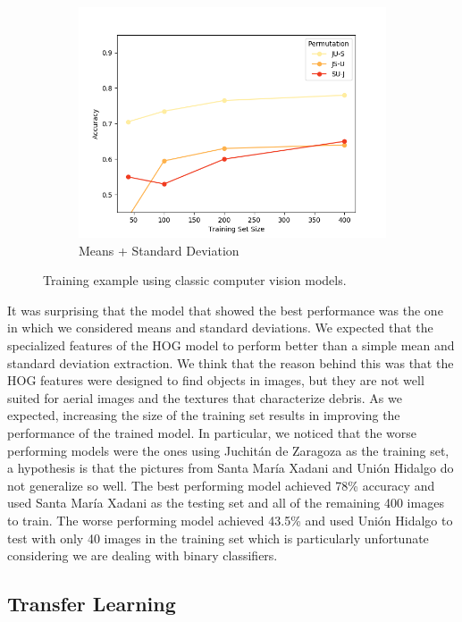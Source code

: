 \begin{figure}[ht]
\begin{subfigure}{.49\textwidth}
        \includegraphics[width=\textwidth]{images/classic-meanstd.png}
        \caption{Means + Standard Deviation}
    \end{subfigure}
  
  \caption{Training example using classic computer vision models.}
  \label{fig:classic}
\end{figure}

It was surprising that the model that showed the best performance was the one in which we considered means and standard deviations. We expected that the specialized features of the HOG model to perform better than a simple mean and standard deviation extraction. We think that the reason behind this was that the HOG features were designed to find objects in images, but they are not well suited for aerial images and the textures that characterize debris. As we expected, increasing the size of the training set results in improving the performance of the trained model. In particular, we noticed that the worse performing models were the ones using Juchit\'an de Zaragoza as the training set, a hypothesis is that the pictures from Santa Mar\'ia Xadani and Uni\'on Hidalgo do not generalize so well. The best performing model achieved 78\% accuracy and used Santa Mar\'ia Xadani as the testing set and all of the remaining 400 images to train. The worse performing model achieved 43.5\% and used Uni\'on Hidalgo to test with only 40 images in the training set which is particularly unfortunate considering we are dealing with binary classifiers.\\

\subsection{Transfer Learning}

